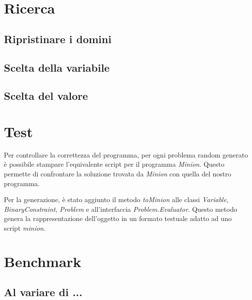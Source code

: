 \documentclass[a4paper,12pt,italian]{article}
\begin{document}
\section{Ricerca}
\subsection{Ripristinare i domini}
\subsection{Scelta della variabile}
\subsection{Scelta del valore}

\section{Test}

Per controllare la correttezza del programma, per ogni problema random
generato \`e possibile stampare l'equivalente script per il programma
\textit{Minion}. Questo permette di confrontare la soluzione trovata
da \textit{Minion} con quella del nostro programma.

Per la generazione, \`e stato aggiunto il metodo \textit{toMinion}
alle classi \textit{Variable}, \textit{BinaryConstraint},
\textit{Problem} e all'interfaccia \textit{Problem.Evaluator}. Questo
metodo genera la rappresentazione dell'oggetto in un formato testuale
adatto ad uno script \textit{minion}.

\section{Benchmark}

\subsection{Al variare di ...}
\end{document}
